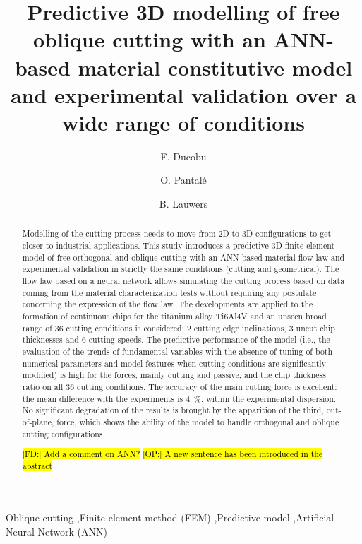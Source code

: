 \documentclass[preprint,12pt,times]{elsarticle}
\DeclareRobustCommand{\FD}[1]{ {\begingroup\sethlcolor{VWgreen}\textcolor{black}{\hl{[FD:] #1}}\endgroup} }
\DeclareRobustCommand{\OP}[1]{ {\begingroup\sethlcolor{VWblue}\textcolor{black}{\hl{[OP:] #1}}\endgroup} }
\begin{document}
\begin{frontmatter}

\title{Predictive 3D modelling of free oblique cutting with an ANN-based material constitutive model and experimental validation over a wide range of conditions}

\author[1]{F. Ducobu}

\author[2]{O. Pantal\'{e}}
\author[3]{B. Lauwers}

\address[1]{Machine Design and Production Engineering Lab, Research Institute for Science and Material Engineering, UMONS, Belgium}
\address[2]{Laboratoire G\'{e}nie de Production, INP/ENIT, Universit\'{e} de Toulouse, Tarbes, France}
\address[3]{Department of Mechanical Engineering, KU Leuven \& Flanders Make@KU Leuven-MaPS, Belgium}

\begin{abstract}

Modelling of the cutting process needs to move from 2D to 3D configurations to get closer to industrial applications. This study introduces a predictive 3D finite element model of free orthogonal and oblique cutting with an ANN-based material flow law and experimental validation in strictly the same conditions (cutting and geometrical). The flow law based on a neural network allows simulating the cutting process based on data coming from the material characterization tests without requiring any postulate concerning the expression of the flow law. The developments are applied to the formation of continuous chips for the titanium alloy Ti6Al4V and an unseen broad range of 36 cutting conditions is considered: 2 cutting edge inclinations, 3 uncut chip thicknesses and 6 cutting speeds. The predictive performance of the model (i.e., the evaluation of the trends of fundamental variables with the absence of tuning of both numerical parameters and model features when cutting conditions are significantly modified) is high for the forces, mainly cutting and passive, and the chip thickness ratio on all 36 cutting conditions. The accuracy of the main cutting force is excellent: the mean difference with the experiments is \qty{4}{\%}, within the experimental dispersion. No significant degradation of the results is brought by the apparition of the third, out-of-plane, force, which shows the ability of the model to handle orthogonal and oblique cutting configurations.

\FD{Add a comment on ANN?}
\OP{A new sentence has been introduced in the abstract}

\end{abstract}

\begin{keyword}

Oblique cutting \sep Finite element method (FEM) \sep Predictive model \sep Artificial Neural Network (ANN)

\end{keyword}

\end{frontmatter}
\end{document}
